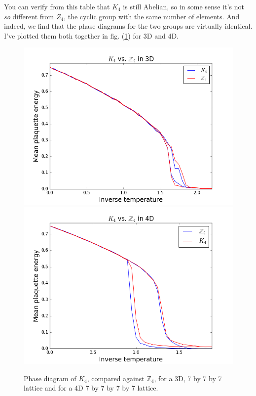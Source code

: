 \documentclass[9pt,twocolumn,twoside]{article}
\begin{document}
You can verify from this table that $K_4$ is still Abelian, so in some sense it's not \textit{so} different from $Z_4$, the cyclic group with the same number of elements.  And indeed, we find that the phase diagrams for the two groups are virtually identical.  I've plotted them both together in fig. (\ref{k4vz4}) for 3D and 4D.

\begin{figure}[h!]
	\begin{centering}
	\includegraphics[width=\columnwidth]{k4vz4,3d}
	\includegraphics[width=\columnwidth]{k4vz4,4d}
	\caption{Phase diagram of $K_4$, compared against $\mathbb{Z}_4$, for a 3D, 7 by 7 by 7 lattice and for a 4D 7 by 7 by 7 by 7 lattice.}
	\label{k4vz4}
	\end{centering}
\end{figure}
\end{document}
